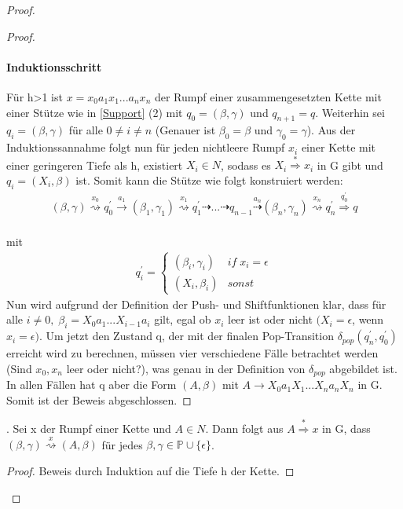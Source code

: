 \begin{proof}
\begin{proof}
\paragraph{Induktionsschritt}
Für h>1 ist $x=x_0a_1x_1...a_nx_n$ der Rumpf einer zusammengesetzten Kette mit einer Stütze wie in \autoref{Support} (2) mit $q_0=(\beta, \gamma)$ und $q_{n+1}=q$. Weiterhin sei $q_i=(\beta, \gamma)$ für alle $0 \neq i \neq n$ (Genauer ist $\beta_0 = \beta$ und $\gamma_0 = \gamma$). Aus der Induktionssannahme folgt nun für jeden nichtleere Rumpf $x_i$ einer Kette mit einer geringeren Tiefe als h, existiert $X_i \in N$, sodass es $X_i \stackrel{*}{\Rightarrow} x_i$ in G gibt und $q_i=(X_i, \beta)$ ist. Somit kann die Stütze wie folgt konstruiert werden:
 \begin{eqnarray*}
(\beta, \gamma) \stackrel{x_0}{\rightsquigarrow} q_0^{\prime} \stackrel{a_1}{\rightarrow} (\beta_1, \gamma_1) \stackrel{x_1}{\rightsquigarrow} q_1^{\prime} \dashrightarrow ... \dashrightarrow q_{n-1} \stackrel{a_n}{\dashrightarrow} (\beta_n, \gamma_n) \stackrel{x_n}{\rightsquigarrow} q_n^{\prime} \stackrel {q_0^{\prime}} {\Rightarrow} q
\end{eqnarray*}\\
mit 
\begin{eqnarray*}
q_i^\prime = \begin{cases}
(\beta_i, \gamma_i) & if \; x_i = \epsilon \\
(X_i, \beta_i) & sonst
\end{cases}
\end{eqnarray*}
Nun wird aufgrund der Definition der Push- und Shiftfunktionen klar, dass für alle $i \neq 0,\; \beta_i = X_0a_1...X_{i-1}a_i$ gilt, egal ob $x_i$ leer ist oder nicht $(X_i=\epsilon$, wenn $x_i=\epsilon)$. Um jetzt den Zustand q, der mit der finalen Pop-Transition $\delta_{pop}(q_n^\prime, q_0^\prime)$ erreicht wird zu berechnen, müssen vier verschiedene Fälle betrachtet werden (Sind $x_0, x_n$ leer oder nicht?), was genau in der Definition von $\delta_{pop}$ abgebildet ist. In allen Fällen hat q aber die Form $(A, \beta)$ mit $A \rightarrow X_0a_1X_1...X_na_nX_n$ in G.\\
 Somit ist der Beweis abgeschlossen.
\end{proof}

\begin{lemma}.
Sei x der Rumpf einer Kette und $A \in N$. Dann folgt aus $A \stackrel{*}{\Rightarrow} x$ in G, dass $(\beta, \gamma) \stackrel{x}{\rightsquigarrow}(A, \beta)$ für jedes $\beta, \gamma \in \mathbb{P} \cup \{\epsilon\}$.
\end{lemma}
\begin{proof}
Beweis durch Induktion auf die Tiefe h der Kette. 

\end{proof}
\end{proof}
